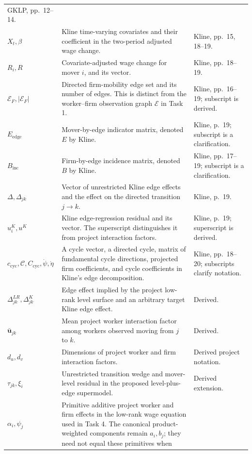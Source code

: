 \documentclass[11pt]{article}
\begin{document}
\begin{longtable}{p{}p{}p{}}
GKLP, pp.\ 12--14. \\
\(X_t,\beta\) & Kline time-varying covariates and their coefficient in the
two-period adjusted wage change. & Kline, pp.\ 15, 18--19. \\
\(R_i,R\) & Covariate-adjusted wage change for mover \(i\), and its vector. &
Kline, pp.\ 18--19. \\
\(\mathcal E_F,|\mathcal E_F|\) & Directed firm-mobility edge set and its
number of edges.  This is distinct from the worker--firm observation graph
\(\mathcal E\) in Task 1. & Kline, pp.\ 16--19; subscript is derived. \\
\(E_{\mathrm{edge}}\) & Mover-by-edge indicator matrix, denoted \(E\) by
Kline. & Kline, p.\ 19; subscript is a clarification. \\
\(B_{\mathrm{inc}}\) & Firm-by-edge incidence matrix, denoted \(B\) by
Kline. & Kline, pp.\ 17--19; subscript is a clarification. \\
\(\Delta,\Delta_{jk}\) & Vector of unrestricted Kline edge effects and the
effect on the directed transition \(j\to k\). & Kline, p.\ 19. \\
\(u^{K}_i,u^K\) & Kline edge-regression residual and its vector.  The
superscript distinguishes it from project interaction factors. & Kline,
p.\ 19; superscript is derived. \\
\(c_{\mathrm{cyc}},\mathcal C,C_{\mathrm{cyc}},\dot\psi,\dot\eta\) & A cycle
vector, a directed cycle, matrix of fundamental cycle directions, projected
firm coefficients, and cycle coefficients in Kline's edge decomposition. &
Kline, pp.\ 18--20; subscripts clarify notation. \\
\(\Delta^{LR}_{jk},\Delta^K_{jk}\) & Edge effect implied by the project
low-rank level surface and an arbitrary target Kline edge effect. & Derived. \\
\(\bar{\mathbf u}_{jk}\) & Mean project worker interaction factor among
workers observed moving from \(j\) to \(k\). & Derived. \\
\(d_u,d_v\) & Dimensions of project worker and firm interaction factors. &
Derived project notation. \\
\(\tau_{jk},\xi_i\) & Unrestricted transition wedge and mover-level residual
in the proposed level-plus-edge supermodel. & Derived extension. \\
\(\alpha_i,\psi_j\) & Primitive additive project worker and firm effects in
the low-rank wage equation used in Task 4.  The canonical product-weighted
components remain \(a_i,b_j\); they need not equal these primitives when

\end{longtable}
\end{document}
